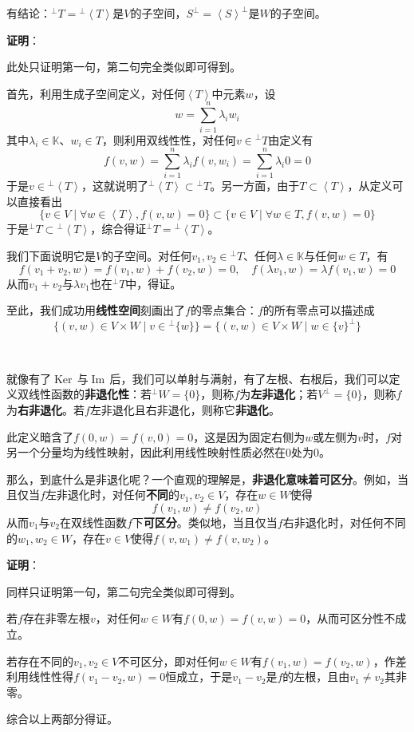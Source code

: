 \documentclass[a4paper,UTF8,fontset=windows,AutoFakeBold]{ctexart}
\DeclareMathOperator{\im}{Im\,}
\DeclareMathOperator{\Ker}{Ker\,}
\newcommand*{\note}{\noindent *}
\newcommand{\proo}[1]{{\vspace{5pt}\kaishu\noindent\textbf{证明}：\vspace{-3pt}
\begin{compactitem}
    \item[] #1
\end{compactitem}
}}
\begin{document}
有结论：$^\bot T={}^\bot\left<T\right>$是$V$的子空间，$S^\bot=\left<S\right>^\bot$是$W$的子空间。

\proo{
    此处只证明第一句，第二句完全类似即可得到。

    首先，利用生成子空间定义，对任何$\left<T\right>$中元素$w$，设
    $$w=\sum_{i=1}^n\lambda_iw_i$$
    其中$\lambda_i\in\mathbb{K}$、$w_i\in T$，则利用双线性性，对任何$v\in{}^\bot T$由定义有
    $$f(v,w)=\sum_{i=1}^n\lambda_if(v,w_i)=\sum_{i=1}^n\lambda_i 0=0$$
    于是$v\in{}^\bot\left<T\right>$，这就说明了$^\bot\left<T\right>\subset{}^\bot T$。另一方面，由于$T\subset\left<T\right>$，从定义可以直接看出
    $$\{v\in V\mid\forall w\in\left<T\right>,f(v,w)=0\}\subset\{v\in V\mid\forall w\in T,f(v,w)=0\}$$
    于是$^\bot T\subset{}^\bot\left<T\right>$，综合得证$^\bot T={}^\bot\left<T\right>$。

    我们下面说明它是$V$的子空间。对任何$v_1,v_2\in{}^\bot T$、任何$\lambda\in\mathbb{K}$与任何$w\in T$，有
    $$f(v_1+v_2,w)=f(v_1,w)+f(v_2,w)=0,\quad f(\lambda v_1,w)=\lambda f(v_1,w)=0$$
    从而$v_1+v_2$与$\lambda v_1$也在$^\bot T$中，得证。
}

至此，我们成功用\textbf{线性空间}刻画出了$f$的零点集合：$f$的所有零点可以描述成
$$\big\{(v,w)\in V\times W\mid v\in{}^\bot\{w\}\big\}=\big\{(v,w)\in V\times W\mid w\in\{v\}^\bot\big\}$$

\

就像有了$\Ker$与$\im$后，我们可以单射与满射，有了左根、右根后，我们可以定义双线性函数的\textbf{非退化性}：若$^\bot W=\{0\}$，则称$f$为\textbf{左非退化}；若$V^\bot=\{0\}$，则称$f$为\textbf{右非退化}。若$f$左非退化且右非退化，则称它\textbf{非退化}。

\note 此定义暗含了$f(0,w)=f(v,0)=0$，这是因为固定右侧为$w$或左侧为$v$时，$f$对另一个分量均为线性映射，因此利用线性映射性质必然在0处为0。

那么，到底什么是非退化呢？一个直观的理解是，\textbf{非退化意味着可区分}。例如，当且仅当$f$左非退化时，对任何\textbf{不同}的$v_1,v_2\in V$，存在$w\in W$使得
$$f(v_1,w)\ne f(v_2,w)$$
从而$v_1$与$v_2$在双线性函数$f$下\textbf{可区分}。类似地，当且仅当$f$右非退化时，对任何不同的$w_1,w_2\in W$，存在$v\in V$使得$f(v,w_1)\ne f(v,w_2)$。

\proo{
    同样只证明第一句，第二句完全类似即可得到。

    若$f$存在非零左根$v$，对任何$w\in W$有$f(0,w)=f(v,w)=0$，从而可区分性不成立。

    若存在不同的$v_1,v_2\in V$不可区分，即对任何$w\in W$有$f(v_1,w)=f(v_2,w)$，作差利用线性性得$f(v_1-v_2,w)=0$恒成立，于是$v_1-v_2$是$f$的左根，且由$v_1\ne v_2$其非零。

    综合以上两部分得证。
}
\end{document}
